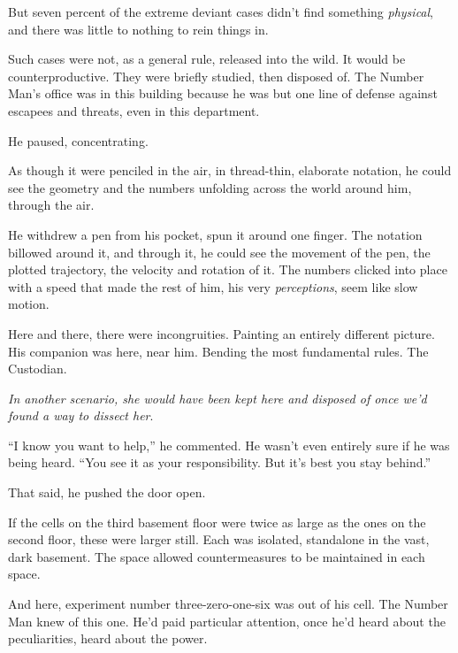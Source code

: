 But seven percent of the extreme deviant cases didn't find something \emph{physical}, and there was little to nothing to rein things in.



Such cases were not, as a general rule, released into the wild.  It would be counterproductive.  They were briefly studied, then disposed of.  The Number Man's office was in this building because he was but one line of defense against escapees and threats, even in this department.



He paused, concentrating.



As though it were penciled in the air, in thread-thin, elaborate notation, he could see the geometry and the numbers unfolding across the world around him, through the air.



He withdrew a pen from his pocket, spun it around one finger.  The notation billowed around it, and through it, he could see the movement of the pen, the plotted trajectory, the velocity and rotation of it.  The numbers clicked into place with a speed that made the rest of him, his very \emph{perceptions}, seem like slow motion.



Here and there, there were incongruities.  Painting an entirely different picture.  His companion was here, near him.  Bending the most fundamental rules.  The Custodian.



\emph{In another scenario, she would have been kept here and disposed of once we'd found a way to dissect her}.



``I know you want to help,'' he commented.  He wasn't even entirely sure if he was being heard.  ``You see it as your responsibility.  But it's best you stay behind.''



That said, he pushed the door open.



If the cells on the third basement floor were twice as large as the ones on the second floor, these were larger still.  Each was isolated, standalone in the vast, dark basement.  The space allowed countermeasures to be maintained in each space.



And here, experiment number three-zero-one-six was out of his cell.  The Number Man knew of this one.  He'd paid particular attention, once he'd heard about the peculiarities, heard about the power.



